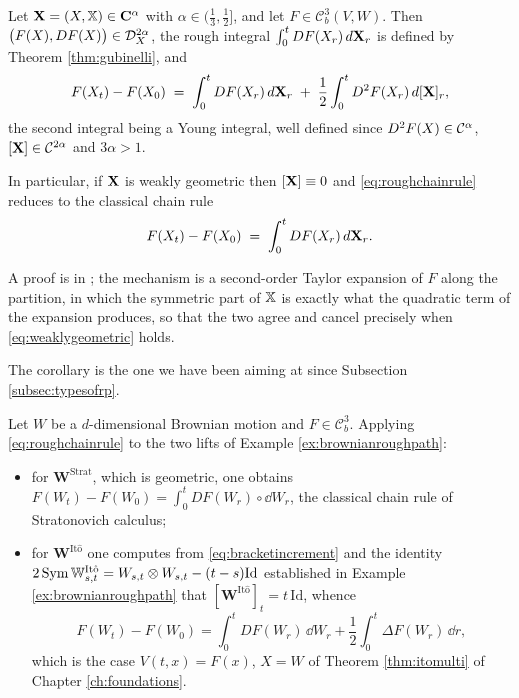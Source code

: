 \begin{proposition}\label{prop:roughchainrule}
Let $\mathbf{X} = (X,\mathbb{X}) \in \mathbf{C}^{\alpha}$ with $\alpha\in(\tfrac13,\tfrac12]$, and let
$F \in \mathcal{C}^3_b(V,W)$. Then $\bigl(F(X), DF(X)\bigr) \in \mathcal{D}^{2\alpha}_{X}$, the rough integral
$\int_0^t DF(X_r)\,d\mathbf{X}_r$ is defined by Theorem \ref{thm:gubinelli}, and
\begin{equation}\label{eq:roughchainrule}
F(X_t) - F(X_0) \;=\; \int_0^t DF(X_r)\,d\mathbf{X}_r \;+\; \frac12\int_0^t D^2F(X_r)\,d[\mathbf{X}]_r ,
\end{equation}
the second integral being a Young integral, well defined since $D^2F(X)\in\mathcal{C}^{\alpha}$,
$[\mathbf{X}]\in\mathcal{C}^{2\alpha}$ and $3\alpha>1$.

In particular, if $\mathbf{X}$ is weakly geometric then $[\mathbf{X}]\equiv0$ and \eqref{eq:roughchainrule}
reduces to the classical chain rule
\begin{equation}\label{eq:classicalchainrule}
F(X_t) - F(X_0) \;=\; \int_0^t DF(X_r)\,d\mathbf{X}_r .
\end{equation}
\qedopen
\end{proposition}

A proof is in \cite[Ch.\ 7]{frizhairer2020}; the mechanism is a second-order Taylor expansion of
$F$ along the partition, in which the symmetric part of $\mathbb{X}$ is exactly what the quadratic term
of the expansion produces, so that the two agree and cancel precisely when
\eqref{eq:weaklygeometric} holds.

The corollary is the one we have been aiming at since Subsection \ref{subsec:typesofrp}.

\begin{corollary}\label{cor:itoformula}
Let $W$ be a $d$-dimensional Brownian motion and $F\in\mathcal{C}^3_b$. Applying
\eqref{eq:roughchainrule} to the two lifts of Example \ref{ex:brownianroughpath}:
\begin{itemize}
    \item[i)] for $\mathbf{W}^{\mathrm{Strat}}$, which is geometric, one obtains
    $F(W_t)-F(W_0) = \int_0^t DF(W_r)\circ\dd W_r$, the classical chain rule of Stratonovich
    calculus;
    \item[ii)] for $\mathbf{W}^{\mathrm{It\hat o}}$ one computes from \eqref{eq:bracketincrement}
    and the identity $2\operatorname{Sym}\mathbb{W}^{\mathrm{It\hat o}}_{s,t} = W_{s,t}\otimes W_{s,t} - (t-s)\mathrm{Id}$
    established in Example \ref{ex:brownianroughpath} that
    $[\mathbf{W}^{\mathrm{It\hat o}}]_t = t\,\mathrm{Id}$, whence
    \begin{equation}\label{eq:itofromrough}
    F(W_t)-F(W_0) = \int_0^t DF(W_r)\,\dd W_r + \frac12\int_0^t \Delta F(W_r)\,\dd r ,
    \end{equation}
    which is the case $V(t,x) = F(x)$, $X = W$ of Theorem \ref{thm:itomulti} of Chapter
    \ref{ch:foundations}. \qedfilledtext
\end{itemize}
\end{corollary}

